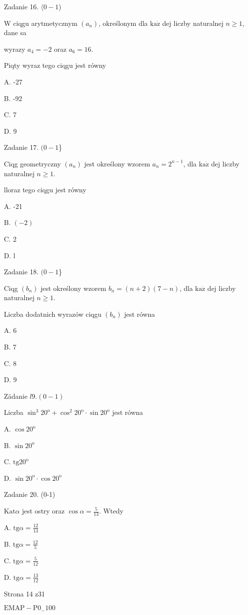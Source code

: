 \documentclass[a4paper,12pt]{article}
\begin{document}
Zadanie 16. $\langle 0-1$)

$\mathrm{W}$ ciqgu arytmetycznym $(a_{n})$, określonym dla $\mathrm{k}\mathrm{a}\dot{\mathrm{z}}$ dej liczby naturalnej $n\geq 1$, dane sa

wyrazy $a_{4}=-2$ oraz $a_{6}=16.$

Piqty wyraz tego ciqgu jest równy

A. -27

B. -92

C. 7

D. 9

Zadanie 17. $(0-1$\}

Ciqg geometryczny $(a_{n})$ jest określony wzorem $a_{n}=2^{n-1}$, dla $\mathrm{k}\mathrm{a}\dot{\mathrm{z}}$ dej liczby naturalnej $n\geq 1.$

lloraz tego ciqgu jest równy

A. -21

B. $(-2)$

C. 2

D. l

Zadanie 18. $(0-1$\}

Ciqg $(b_{n})$ jest określony wzorem $b_{n}=(n+2)(7-n)$, dla $\mathrm{k}\mathrm{a}\dot{\mathrm{z}}$ dej liczby naturalnej $n\geq 1.$

Liczba dodatnich wyrazów ciqgu $(b_{n})$ jest równa

A. 6

B. 7

C. 8

D. 9

Zädanie $l9. (0-1)$

Liczba $\sin^{3}20^{\mathrm{o}}+\cos^{2}20^{\mathrm{o}}\cdot\sin 20^{\mathrm{o}}$ jest równa

A. $\cos 20^{\mathrm{o}}$

B. $\sin 20^{\mathrm{o}}$

C. $\mathrm{t}\mathrm{g}20^{\mathrm{o}}$

D. $\sin 20^{\mathrm{o}}\cdot\cos 20^{\mathrm{o}}$

Zadanie 20. (0-1)

$\mathrm{K}\mathrm{a}\mathrm{t} \alpha$ jest ostry oraz $\cos\alpha= \displaystyle \frac{5}{13}$. Wtedy

A. $\displaystyle \mathrm{t}\mathrm{g}\alpha=\frac{12}{13}$

B. $\displaystyle \mathrm{t}\mathrm{g}\alpha=\frac{12}{5}$

C. $\displaystyle \mathrm{t}\mathrm{g}\alpha=\frac{5}{12}$

D. $\displaystyle \mathrm{t}\mathrm{g}\alpha=\frac{13}{12}$

Strona 14 z31

$\mathrm{E}\mathrm{M}\mathrm{A}\mathrm{P}-\mathrm{P}0_{-}100$
\end{document}
